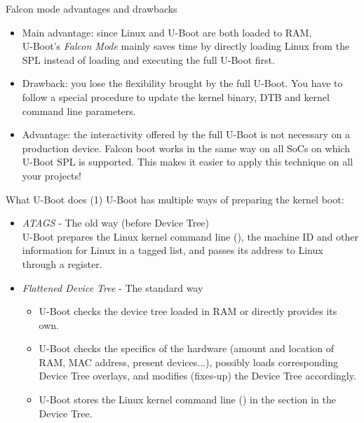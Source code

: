 \begin{frame}{Falcon mode advantages and drawbacks}
  \begin{itemize}
     \item Main advantage: since Linux and U-Boot are both loaded to RAM,\\
           U-Boot's {\em Falcon Mode} mainly saves time by directly loading Linux from the SPL
           instead of loading and executing the full U-Boot first.
     \item Drawback: you lose the flexibility brought by the full
           U-Boot. You have to follow a special procedure to update the kernel
           binary, DTB and kernel command line parameters.
     \item Advantage: the interactivity offered by the full U-Boot is
           not necessary on a production device. Falcon boot works in
           the same way on all SoCs on which U-Boot SPL is supported.
	   This makes it easier to apply this technique on all your
	   projects!
  \end{itemize}
\end{frame}

\begin{frame}{What U-Boot does (1)}
  U-Boot has multiple ways of preparing the kernel boot:
  \begin{itemize}
    \item {\em ATAGS} - The old way (before Device Tree)\\
          U-Boot prepares the Linux kernel command
	  line (), the machine ID and other information for Linux in
	  a tagged list, and passes its address to Linux through a
	  register.
    \item {\em Flattened Device Tree} - The standard way
    \begin{itemize}
	\item U-Boot checks the device tree loaded in RAM
	      or directly provides its own.
	\item U-Boot checks the specifics of the hardware
	      (amount and location of RAM, MAC address, present
	      devices...), possibly loads corresponding Device Tree overlays,
	      and modifies (fixes-up) the Device Tree accordingly.
	\item U-Boot stores the Linux kernel command line
	      () in the  section
	      in the Device Tree.
    \end{itemize}
  \end{itemize}
\end{frame}

